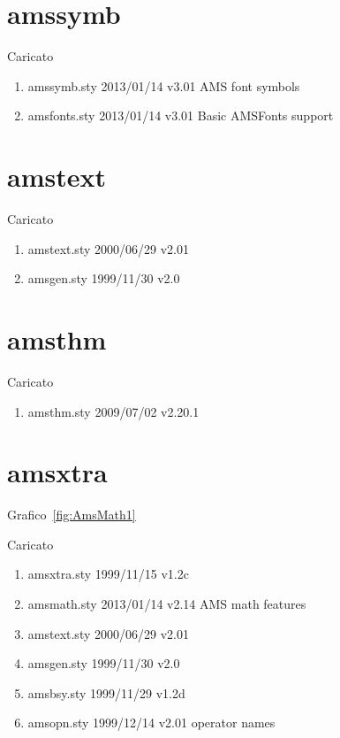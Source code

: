 \section{amssymb}

Caricato 
\begin{enumerate}
\item amssymb.sty 2013/01/14 v3.01 AMS font symbols
\item amsfonts.sty 2013/01/14 v3.01 Basic AMSFonts support
\end{enumerate}
\section{amstext}

Caricato 
\begin{enumerate}
\item amstext.sty 2000/06/29 v2.01
\item amsgen.sty 1999/11/30 v2.0
\end{enumerate}
\section{amsthm}

Caricato 
\begin{enumerate}
\item amsthm.sty 2009/07/02 v2.20.1
\end{enumerate}
\section{amsxtra}

Grafico~\vref{fig:AmsMath1}

Caricato 
\begin{enumerate}
\item amsxtra.sty 1999/11/15 v1.2c
\item amsmath.sty 2013/01/14 v2.14 AMS math features
\item amstext.sty 2000/06/29 v2.01
\item amsgen.sty 1999/11/30 v2.0
\item amsbsy.sty 1999/11/29 v1.2d
\item amsopn.sty 1999/12/14 v2.01 operator names
\end{enumerate}
